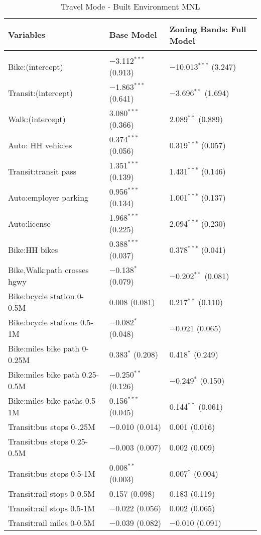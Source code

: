 \begin{longtabu}{lll}
	\caption{Travel Mode - Built Environment MNL} \\
	\label{model3} 
	
	Variables															   & Base Model						& Zoning Bands: Full Model  \\ \hline	
	&								&								\\		   
	\endhead
	Bike:(intercept) & $-$3.112$^{***}$ (0.913) & $-$10.013$^{***}$ (3.247) \\ 
	Transit:(intercept) & $-$1.863$^{***}$ (0.641) & $-$3.696$^{**}$ (1.694) \\ 
	Walk:(intercept) & 3.080$^{***}$ (0.366) & 2.089$^{**}$ (0.889) \\ 
	Auto: HH vehicles & 0.374$^{***}$ (0.056) & 0.319$^{***}$ (0.057) \\ 
	Transit:transit pass & 1.351$^{***}$ (0.139) & 1.431$^{***}$ (0.146) \\ 
	Auto:employer parking & 0.956$^{***}$ (0.134) & 1.001$^{***}$ (0.137) \\ 
	Auto:license & 1.968$^{***}$ (0.225) & 2.094$^{***}$ (0.230) \\ 
	Bike:HH bikes & 0.388$^{***}$ (0.037) & 0.378$^{***}$ (0.041) \\ 
	Bike,Walk:path crosses hgwy & $-$0.138$^{*}$ (0.079) & $-$0.202$^{**}$ (0.081) \\ 
	Bike:bcycle station 0-0.5M & 0.008 (0.081) & 0.217$^{**}$ (0.110) \\ 
	Bike:bcycle stations 0.5-1M & $-$0.082$^{*}$ (0.048) & $-$0.021 (0.065) \\ 
	Bike:miles bike path 0-0.25M & 0.383$^{*}$ (0.208) & 0.418$^{*}$ (0.249) \\ 
	Bike:miles bike path 0.25-0.5M & $-$0.250$^{**}$ (0.126) & $-$0.249$^{*}$ (0.150) \\ 
	Bike:miles bike paths 0.5-1M & 0.156$^{***}$ (0.045) & 0.144$^{**}$ (0.061) \\ 
	Transit:bus stops 0-.25M & $-$0.010 (0.014) & 0.001 (0.016) \\ 
	Transit:bus stops 0.25-0.5M & $-$0.003 (0.007) & 0.002 (0.009) \\ 
	Transit:bus stops 0.5-1M & 0.008$^{**}$ (0.003) & 0.007$^{*}$ (0.004) \\ 
	Transit:rail stops 0-0.5M & 0.157 (0.098) & 0.183 (0.119) \\ 
	Transit:rail stops 0.5-1M & $-$0.022 (0.056) & 0.002 (0.065) \\ 
	Transit:rail miles 0-0.5M & $-$0.039 (0.082) & $-$0.010 (0.091) \\ 

\end{longtabu}
